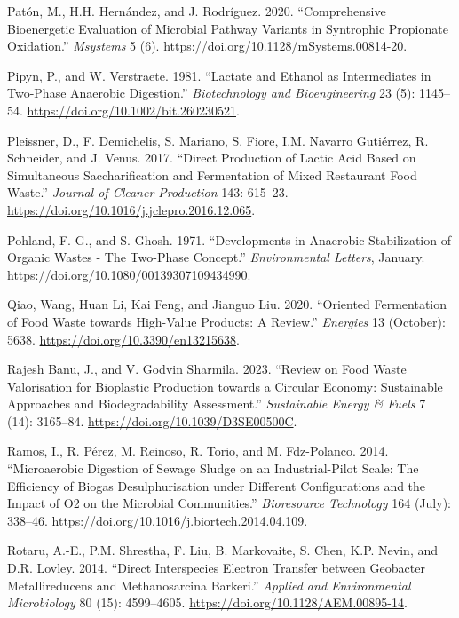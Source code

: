 \documentclass[11pt]{report}
\begin{document}
\begin{hangparas}{1.5em}{1}
\hypertarget{citeproc_bib_item_46}{Patón, M., H.H. Hernández, and J. Rodríguez. 2020. “Comprehensive Bioenergetic Evaluation of Microbial Pathway Variants in Syntrophic Propionate Oxidation.” \textit{Msystems} 5 (6). \url{https://doi.org/10.1128/mSystems.00814-20}.}

\hypertarget{citeproc_bib_item_47}{Pipyn, P., and W. Verstraete. 1981. “Lactate and Ethanol as Intermediates in Two-Phase Anaerobic Digestion.” \textit{Biotechnology and Bioengineering} 23 (5): 1145–54. \url{https://doi.org/10.1002/bit.260230521}.}

\hypertarget{citeproc_bib_item_48}{Pleissner, D., F. Demichelis, S. Mariano, S. Fiore, I.M. Navarro Gutiérrez, R. Schneider, and J. Venus. 2017. “Direct Production of Lactic Acid Based on Simultaneous Saccharification and Fermentation of Mixed Restaurant Food Waste.” \textit{Journal of Cleaner Production} 143: 615–23. \url{https://doi.org/10.1016/j.jclepro.2016.12.065}.}

\hypertarget{citeproc_bib_item_49}{Pohland, F. G., and S. Ghosh. 1971. “Developments in Anaerobic Stabilization of Organic Wastes - The Two-Phase Concept.” \textit{Environmental Letters}, January. \url{https://doi.org/10.1080/00139307109434990}.}

\hypertarget{citeproc_bib_item_50}{Qiao, Wang, Huan Li, Kai Feng, and Jianguo Liu. 2020. “Oriented Fermentation of Food Waste towards High-Value Products: A Review.” \textit{Energies} 13 (October): 5638. \url{https://doi.org/10.3390/en13215638}.}

\hypertarget{citeproc_bib_item_51}{Rajesh Banu, J., and V. Godvin Sharmila. 2023. “Review on Food Waste Valorisation for Bioplastic Production towards a Circular Economy: Sustainable Approaches and Biodegradability Assessment.” \textit{Sustainable Energy \& Fuels} 7 (14): 3165–84. \url{https://doi.org/10.1039/D3SE00500C}.}

\hypertarget{citeproc_bib_item_52}{Ramos, I., R. Pérez, M. Reinoso, R. Torio, and M. Fdz-Polanco. 2014. “Microaerobic Digestion of Sewage Sludge on an Industrial-Pilot Scale: The Efficiency of Biogas Desulphurisation under Different Configurations and the Impact of O2 on the Microbial Communities.” \textit{Bioresource Technology} 164 (July): 338–46. \url{https://doi.org/10.1016/j.biortech.2014.04.109}.}

\hypertarget{citeproc_bib_item_53}{Rotaru, A.-E., P.M. Shrestha, F. Liu, B. Markovaite, S. Chen, K.P. Nevin, and D.R. Lovley. 2014. “Direct Interspecies Electron Transfer between Geobacter Metallireducens and Methanosarcina Barkeri.” \textit{Applied and Environmental Microbiology} 80 (15): 4599–4605. \url{https://doi.org/10.1128/AEM.00895-14}.}


\end{hangparas}
\end{document}
